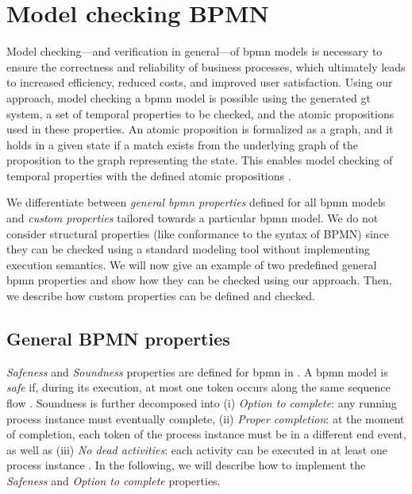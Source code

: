 \documentclass[runningheads]{llncs}
\begin{document}
\section{Model checking BPMN} \label{sec:modelChecking}

Model checking---and verification in general---of \gls*{bpmn} models is necessary to ensure the correctness and reliability of business processes, which ultimately leads to increased efficiency, reduced costs, and improved user satisfaction.
Using our approach, model checking a \gls*{bpmn} model is possible using the generated \gls*{gt} system, a set of temporal properties to be checked, and the atomic propositions used in these properties.
An atomic proposition is formalized as a graph, and it holds in a given state if a match exists from the underlying graph of the proposition to the graph representing the state.
This enables model checking of temporal properties with the defined atomic propositions \cite{kastenbergModelCheckingDynamic2006}.

We differentiate between \textit{general \gls*{bpmn} properties} defined for all \gls*{bpmn} models and \textit{custom properties} tailored towards a particular \gls*{bpmn} model.
We do not consider structural properties (like conformance to the syntax of BPMN) since they can be checked using a standard modeling tool without implementing execution semantics.
We will now give an example of two predefined general \gls*{bpmn} properties and show how they can be checked using our approach.
Then, we describe how custom properties can be defined and checked.

\subsection{General BPMN properties}
\textit{Safeness} and \textit{Soundness} properties are defined for \gls*{bpmn} in \cite{corradiniClassificationBPMNCollaborations2018}.
A \gls*{bpmn} model is \textit{safe} if, during its execution, at most one token occurs along the same sequence flow \cite{corradiniClassificationBPMNCollaborations2018}.
Soundness is further decomposed into (i) \textit{Option to complete}: any running process instance must eventually complete, (ii) \textit{Proper completion}: at the moment of completion, each token of the process instance must be in a different end event, as well as (iii) \textit{No dead activities}: each activity can be executed in at least one process instance \cite{corradiniClassificationBPMNCollaborations2018}.
In the following, we will describe how to implement the \textit{Safeness} and \textit{Option to complete} properties.
\end{document}
